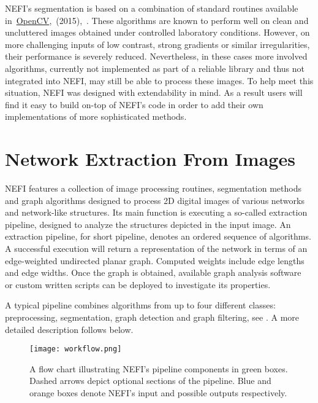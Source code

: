 	NEFI's segmentation is based on a combination of standard routines available in~\href{http://opencv.org/}{OpenCV},~(2015),~\cite{opencv}. These algorithms are known to perform well on clean and uncluttered images obtained under controlled laboratory conditions. However, on more challenging inputs of low contrast, strong gradients or similar irregularities, their performance is severely reduced. Nevertheless, in these cases more involved algorithms, currently not implemented as part of a reliable library and thus not integrated into NEFI, may still be able to process these images. To help meet this situation, NEFI was designed with extendability in mind. As a result users will find it easy to build on-top of NEFI's code in order to add their own implementations of more sophisticated methods. 

\section{Network Extraction From Images}	%

	NEFI features a collection of image processing routines, segmentation methods and graph algorithms designed to process 2D digital images of various networks and network-like structures. Its main function is executing a so-called extraction pipeline, designed to analyze the structures depicted in the input image. An extraction pipeline, for short pipeline, denotes an ordered sequence of algorithms. A successful execution will return a representation of the network in terms of an edge-weighted undirected planar graph. Computed weights include edge lengths and edge widths. Once the graph is obtained, available graph analysis software~\cite{ICWSM09154,snap,batagelj1998pajek,5437689,loscalzo2008social,hagberg2008exploring} or custom written scripts can be deployed to investigate its properties.

	A typical pipeline combines algorithms from up to four different classes: preprocessing, segmentation, graph detection and graph filtering, see . A more detailed description follows below. 
	
	\begin{figure}
		\centering
		\texttt{[image: workflow.png]}
		\caption[Pipeline components of NEFI]{A flow chart illustrating NEFI's pipeline components in green boxes. Dashed arrows depict optional sections of the pipeline. Blue and orange boxes denote NEFI's input and possible outputs respectively.}
		\label{fig:workflow}
	\end{figure}

